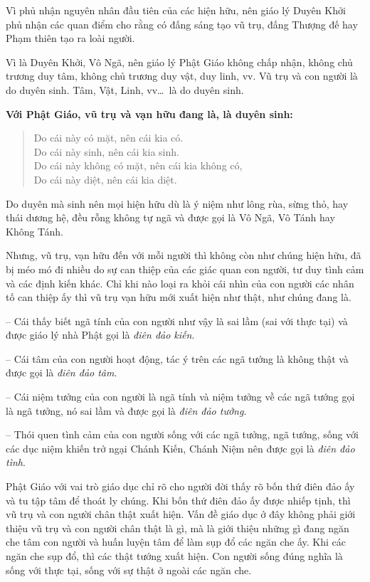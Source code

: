 Vì phủ nhận nguyên nhân đầu tiên của các hiện hữu, nên giáo lý Duyên Khởi phủ nhận các quan điểm cho rằng có đấng sáng tạo vũ trụ, đấng Thượng đế hay Phạm thiên tạo ra loài người.

Vì là Duyên Khởi, Vô Ngã, nên giáo lý Phật Giáo không chấp nhận, không chủ trương duy tâm, không chủ trương duy vật, duy linh, vv. Vũ trụ và con người là do duyên sinh. Tâm, Vật, Linh, vv\ldots ~là do duyên sinh.

\hrulefill

{\bf Với Phật Giáo, vũ trụ và vạn hữu đang là, là duyên sinh:}

\begin{verse}
\begin{itshape}
Do cái này có mặt, nên cái kia có.\\
Do cái này sinh, nên cái kia sinh.\\
Do cái này không có mặt, nên cái kia không có,\\
Do cái này diệt, nên cái kia diệt.
\end{itshape}
\end{verse}

\hrulefill

Do duyên mà sinh nên mọi hiện hữu dù là ý niệm như lông rùa, sừng thỏ, hay thái dương hệ, đều rỗng không tự ngã và được gọi là Vô Ngã, Vô Tánh hay Không Tánh.

Nhưng, vũ trụ, vạn hữu đến với mỗi người thì không còn như chúng hiện hữu, đã bị méo mó đi nhiều do sự can thiệp của các giác quan con người, tư duy tình cảm và các định kiến khác. Chỉ khi nào loại ra khỏi cái nhìn của con người các nhân tố can thiệp ấy thì vũ trụ vạn hữu mới xuất hiện như thật, như chúng đang là.

-- Cái thấy biết ngã tính của con người như vậy là sai lầm (sai với thực tại) và được giáo lý nhà Phật gọi là \emph{điên đảo kiến}.

-- Cái tâm của con người hoạt động, tác ý trên các ngã tướng là không thật và được gọi là \emph{điên đảo tâm}.

-- Cái niệm tưởng của con người là ngã tính và niệm tưởng về các ngã tướng gọi là ngã tưởng, nó sai lầm và được gọi là \emph{điên đảo tưởng}.

-- Thói quen tình cảm của con người sống với các ngã tưởng, ngã tướng, sống với các dục niệm khiến trở ngại Chánh Kiến, Chánh Niệm nên được gọi là \emph{điên đảo tình}.

Phật Giáo với vai trò giáo dục chỉ rõ cho người đời thấy rõ bốn thứ điên đảo ấy và tu tập tâm để thoát ly chúng. Khi bốn thứ điên đảo ấy được nhiếp tịnh, thì vũ trụ và con người chân thật xuất hiện. Vấn đề giáo dục ở đây không phải giới thiệu vũ trụ và con người chân thật là gì, mà là giới thiệu những gì đang ngăn che tâm con người và huấn luyện tâm để làm sụp đổ các ngăn che ấy. Khi các ngăn che sụp đổ, thì các thật tướng xuất hiện. Con người sống đúng nghĩa là sống với thực tại, sống với sự thật ở ngoài các ngăn che.

